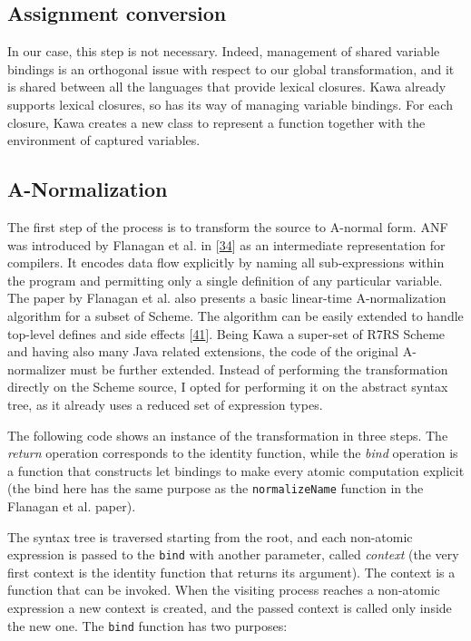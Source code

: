 \documentclass[12pt,a4paper,oneside,openright]{book}
\begin{document}
\subsection{Assignment conversion}\label{assignment-conversion}

In our case, this step is not necessary. Indeed, management of shared
variable bindings is an orthogonal issue with respect to our global
transformation, and it is shared between all the languages that provide
lexical closures. Kawa already supports lexical closures, so has its way
of managing variable bindings. For each closure, Kawa creates a new
class to represent a function together with the environment of captured
variables.

\subsection{A-Normalization}\label{a-normalization}

The first step of the process is to transform the source to A-normal
form. ANF was introduced by Flanagan et al. in
{[}\hyperref[ref-Flanagan1993]{34}{]} as an intermediate representation
for compilers. It encodes data flow explicitly by naming all
sub-expressions within the program and permitting only a single
definition of any particular variable. The paper by Flanagan et al. also
presents a basic linear-time A-normalization algorithm for a subset of
Scheme. The algorithm can be easily extended to handle top-level defines
and side effects {[}\hyperref[ref-ANFMight2015]{41}{]}. Being Kawa a
super-set of R7RS Scheme and having also many Java related extensions,
the code of the original A-normalizer must be further extended. Instead
of performing the transformation directly on the Scheme source, I opted
for performing it on the abstract syntax tree, as it already uses a
reduced set of expression types.

The following code shows an instance of the transformation in three
steps. The \emph{return} operation corresponds to the identity function,
while the \emph{bind} operation is a function that constructs let
bindings to make every atomic computation explicit (the bind here has
the same purpose as the \texttt{normalizeName} function in the Flanagan
et al. paper).

The syntax tree is traversed starting from the root, and each non-atomic
expression is passed to the \texttt{bind} with another parameter, called
\emph{context} (the very first context is the identity function that
returns its argument). The context is a function that can be invoked.
When the visiting process reaches a non-atomic expression a new context
is created, and the passed context is called only inside the new one.
The \texttt{bind} function has two purposes:
\end{document}
